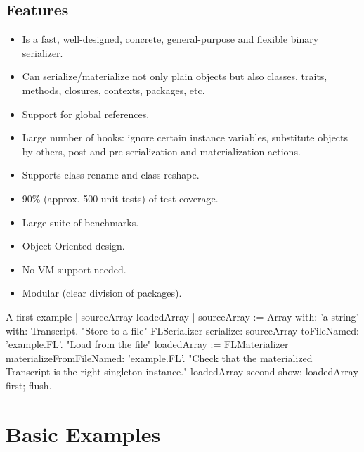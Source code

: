 \documentclass[a4paper,10pt,twoside]{book}
\begin{document}
\subsection{Features} 

\begin{itemize}

\item Is a fast, well-designed, concrete, general-purpose and flexible binary serializer.
\item Can serialize/materialize not only plain objects but also classes, traits, methods, closures, contexts, packages, etc.
\item Support for global references.
\item Large number of hooks: ignore certain instance variables, substitute objects by others, post and pre serialization and materialization actions.
\item Supports class rename and class reshape.
\item 90\% (approx. 500 unit tests) of test coverage.
\item Large suite of benchmarks.
\item Object-Oriented design.
\item No VM support needed.
\item Modular (clear division of packages).

\end{itemize}



\begin{code}{A first example}
| sourceArray loadedArray |
sourceArray := Array with: 'a string' with: Transcript.
"Store to a file"
FLSerializer serialize: sourceArray toFileNamed: 'example.FL'.
"Load from the file"
loadedArray := FLMaterializer materializeFromFileNamed: 'example.FL'.
"Check that the materialized Transcript is the right singleton instance."
loadedArray second show: loadedArray first; flush.
\end{code}



\section{Basic Examples}




\end{document}

